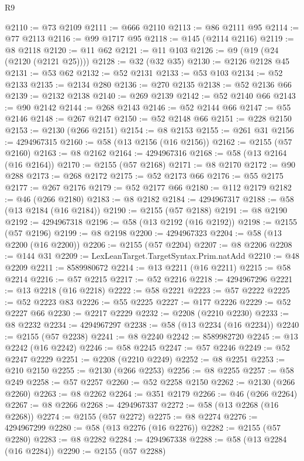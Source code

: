 \begin{lexlean}{R9}
\begin{coremodule}
@2110 := @73 @2109
@2111 := @666 @2110
@2113 := @86 @2111 @95
@2114 := @77 @2113
@2116 := @99 @1717 @95
@2118 := @145 (@2114 @2116)
@2119 := @8 @2118
@2120 := @11 @62
@2121 := @11 @103
@2126 := @9 (@19 (@24 (@2120 (@2121 @25))))
@2128 := @32 (@32 @35)
@2130 := @2126 @2128 @45
@2131 := @53 @62
@2132 := @52 @2131
@2133 := @53 @103
@2134 := @52 @2133
@2135 := @2134 @280
@2136 := @270 @2135
@2138 := @52 @2136 @66
@2139 := @2132 @2138
@2140 := @269 @2139
@2142 := @52 @2140 @66
@2143 := @90 @2142
@2144 := @268 @2143
@2146 := @52 @2144 @66
@2147 := @55 @2146
@2148 := @267 @2147
@2150 := @52 @2148 @66
@2151 := @228 @2150
@2153 := @2130 (@266 @2151)
@2154 := @8 @2153
@2155 := @261 @31
@2156 := 4294967315
@2160 := @58 (@13 @2156 (@16 @2156))
@2162 := @2155 (@57 @2160)
@2163 := @8 @2162
@2164 := 4294967316
@2168 := @58 (@13 @2164 (@16 @2164))
@2170 := @2155 (@57 @2168)
@2171 := @8 @2170
@2172 := @90 @288
@2173 := @268 @2172
@2175 := @52 @2173 @66
@2176 := @55 @2175
@2177 := @267 @2176
@2179 := @52 @2177 @66
@2180 := @112 @2179
@2182 := @46 (@266 @2180)
@2183 := @8 @2182
@2184 := 4294967317
@2188 := @58 (@13 @2184 (@16 @2184))
@2190 := @2155 (@57 @2188)
@2191 := @8 @2190
@2192 := 4294967318
@2196 := @58 (@13 @2192 (@16 @2192))
@2198 := @2155 (@57 @2196)
@2199 := @8 @2198
@2200 := 4294967323
@2204 := @58 (@13 @2200 (@16 @2200))
@2206 := @2155 (@57 @2204)
@2207 := @8 @2206
@2208 := @144 @31
@2209 := LexLeanTarget.TargetSyntax.Prim.natAdd
@2210 := @48 @2209
@2211 := 8589980672
@2214 := @13 @2211 (@16 @2211)
@2215 := @58 @2214
@2216 := @57 @2215
@2217 := @52 @2216
@2218 := 4294967296
@2221 := @13 @2218 (@16 @2218)
@2222 := @58 @2221
@2223 := @57 @2222
@2225 := @52 @2223 @83
@2226 := @55 @2225
@2227 := @177 @2226
@2229 := @52 @2227 @66
@2230 := @2217 @2229
@2232 := @2208 (@2210 @2230)
@2233 := @8 @2232
@2234 := 4294967297
@2238 := @58 (@13 @2234 (@16 @2234))
@2240 := @2155 (@57 @2238)
@2241 := @8 @2240
@2242 := 8589982720
@2245 := @13 @2242 (@16 @2242)
@2246 := @58 @2245
@2247 := @57 @2246
@2249 := @52 @2247 @2229
@2251 := @2208 (@2210 @2249)
@2252 := @8 @2251
@2253 := @210 @2150
@2255 := @2130 (@266 @2253)
@2256 := @8 @2255
@2257 := @58 @249
@2258 := @57 @2257
@2260 := @52 @2258 @2150
@2262 := @2130 (@266 @2260)
@2263 := @8 @2262
@2264 := @351 @2179
@2266 := @46 (@266 @2264)
@2267 := @8 @2266
@2268 := 4294967337
@2272 := @58 (@13 @2268 (@16 @2268))
@2274 := @2155 (@57 @2272)
@2275 := @8 @2274
@2276 := 4294967299
@2280 := @58 (@13 @2276 (@16 @2276))
@2282 := @2155 (@57 @2280)
@2283 := @8 @2282
@2284 := 4294967338
@2288 := @58 (@13 @2284 (@16 @2284))
@2290 := @2155 (@57 @2288)

\end{coremodule}
\end{lexlean}
